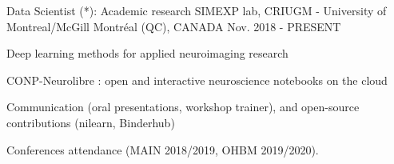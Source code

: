 


\begin{cventries}



\cventry
{Data Scientist (*): Academic research}%
{SIMEXP lab, CRIUGM - University of Montreal/McGill} %
{\hspace{-5mm}Montréal (QC), CANADA} %
{Nov. 2018 - PRESENT} %
{ %
	\begin{cvitems}
		\item {Deep learning methods for applied neuroimaging research}
		\item {CONP-Neurolibre : open and interactive neuroscience notebooks on the cloud}
		\item Communication (oral presentations, workshop trainer), and open-source contributions (nilearn, Binderhub)
		\item Conferences attendance (MAIN 2018/2019, OHBM 2019/2020).
	\end{cvitems}
}



\end{cventries}
